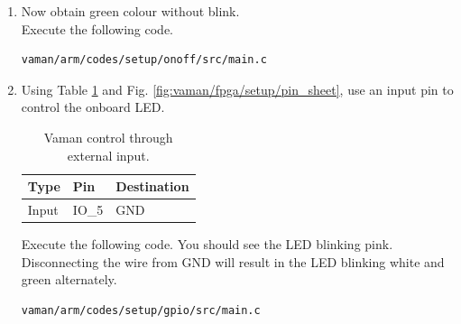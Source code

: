 \begin{enumerate}[label=\arabic*.,ref=\theenumi]
\item Now obtain green colour without blink.
\\
\solution Execute the following code.
\begin{lstlisting}
vaman/arm/codes/setup/onoff/src/main.c
\end{lstlisting}
%
\item  Using Table  \ref{tab:vaman/arm/setup/input} and Fig.  \ref{fig:vaman/fpga/setup/pin_sheet}, use an input pin to control the onboard LED.  

\begin{table}[]
\centering
\begin{tabular}{|l|l|l|}
\hline
Type & Pin  &  Destination\\ \hline
Input &  IO\_5 &  GND\\ \hline
\end{tabular}
\caption{Vaman control through external input.}
\label{tab:vaman/arm/setup/input}
\end{table}

\solution Execute the following code.  You should see the LED blinking pink. Disconnecting the wire from GND will result in the LED blinking white 
and green alternately.
\begin{lstlisting}
vaman/arm/codes/setup/gpio/src/main.c
\end{lstlisting}

\end{enumerate}


